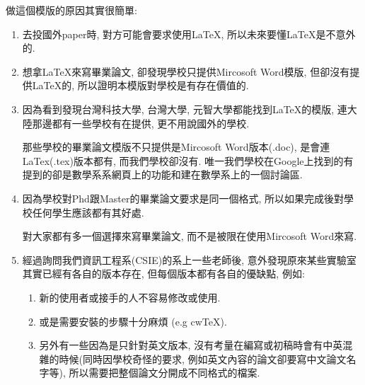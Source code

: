 

做這個模版的原因其實很簡單:

\begin{enumerate}
  \item
  {
    去投國外paper時, 對方可能會要求使用LaTeX, 所以未來要懂LaTeX是不意外的.
  } %

  \item
  {
    想拿LaTeX來寫畢業論文, 卻發現學校只提供Mircosoft Word模版, 但卻沒有提供LaTeX的, 所以證明本模版對學校是有存在價值的.
  } %

  \item
  {
    因為看到發現台灣科技大學, 台灣大學, 元智大學都能找到LaTeX的模版, 連大陸那邊都有一些學校有在提供, 更不用說國外的學校.

    那些學校的畢業論文模版不只提供是Mircosoft Word版本(.doc), 是會連LaTex(.tex)版本都有, 而我們學校卻沒有. 唯一我們學校在Google上找到的有提到的卻是數學系系網頁上的功能和建在數學系上的一個討論區.
  } %

  \item
  {
    因為學校對Phd跟Master的畢業論文要求是同一個格式, 所以如果完成後對學校任何學生應該都有其好處.

    對大家都有多一個選擇來寫畢業論文, 而不是被限在使用Mircosoft Word來寫.
  } %

  \item
  {
    經過詢問我們資訊工程系(CSIE)的系上一些老師後, 意外發現原來某些實驗室其實已經有各自的版本存在, 但每個版本都有各自的優缺點, 例如:

    \begin{enumerate}

      \item
      {
        新的使用者或接手的人不容易修改或使用.
      } %

      \item
      {
        或是需要安裝的步驟十分麻煩 (e.g cwTeX).
      } %

      \item
      {
        另外有一些因為是只針對英文版本, 沒有考量在編寫或初稿時會有中英混雜的時候(同時因學校奇怪的要求, 例如英文內容的論文卻要寫中文論文名字等), 所以需要把整個論文分開成不同格式的檔案.
      } %
    \end{enumerate}
  } %
\end{enumerate}

